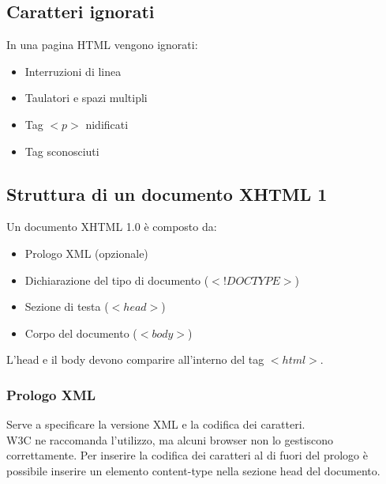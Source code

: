 \documentclass{article}
\begin{document}
\subsection{Caratteri ignorati}
In una pagina HTML vengono ignorati:
\begin{itemize}
	\item Interruzioni di linea
	\item Taulatori e spazi multipli
	\item Tag $<p>$ nidificati
	\item Tag sconosciuti
\end{itemize}
\subsection{Struttura di un documento XHTML 1}
Un documento XHTML 1.0 è composto da:
\begin{itemize}
	\item Prologo XML (opzionale)
	\item Dichiarazione del tipo di documento ($<!DOCTYPE>$)
	\item Sezione di testa ($<head>$)
	\item Corpo del documento ($<body>$)
\end{itemize}
L'head e il body devono comparire all'interno del tag $<html>$.
\subsubsection{Prologo XML}
Serve a specificare la versione XML e la codifica dei caratteri.\\
W3C ne raccomanda l'utilizzo, ma alcuni browser non lo gestiscono correttamente. Per inserire la codifica dei caratteri al di fuori del prologo è possibile inserire un elemento content-type nella sezione head del documento.
\end{document}
